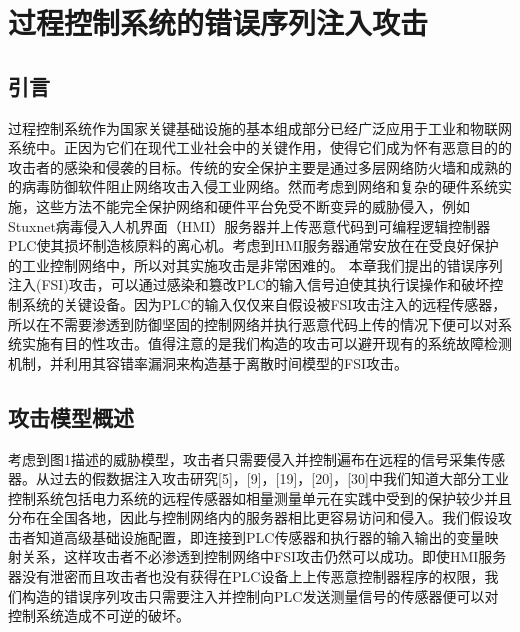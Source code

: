 
\chapter{过程控制系统的错误序列注入攻击}
\label{chap:FSIattack}

\section{引言}
\label{sec:intro}

过程控制系统作为国家关键基础设施的基本组成部分已经广泛应用于工业和物联网系统中。正因为它们在现代工业社会中的关键作用，使得它们成为怀有恶意目的的攻击者的感染和侵袭的目标。传统的安全保护主要是通过多层网络防火墙和成熟的的病毒防御软件阻止网络攻击入侵工业网络。然而考虑到网络和复杂的硬件系统实施，这些方法不能完全保护网络和硬件平台免受不断变异的威胁侵入，例如Stuxnet病毒侵入人机界面（HMI）服务器并上传恶意代码到可编程逻辑控制器PLC使其损坏制造核原料的离心机。考虑到HMI服务器通常安放在在受良好保护的工业控制网络中，所以对其实施攻击是非常困难的。
本章我们提出的错误序列注入(FSI)攻击，可以通过感染和篡改PLC的输入信号迫使其执行误操作和破坏控制系统的关键设备。因为PLC的输入仅仅来自假设被FSI攻击注入的远程传感器，所以在不需要渗透到防御坚固的控制网络并执行恶意代码上传的情况下便可以对系统实施有目的性攻击。值得注意的是我们构造的攻击可以避开现有的系统故障检测机制，并利用其容错率漏洞来构造基于离散时间模型的FSI攻击。

\section{攻击模型概述}
\label{sec:formulation}

考虑到图1描述的威胁模型，攻击者只需要侵入并控制遍布在远程的信号采集传感器。从过去的假数据注入攻击研究[5]，[9]，[19]，[20]，[30]中我们知道大部分工业控制系统包括电力系统的远程传感器如相量测量单元在实践中受到的保护较少并且分布在全国各地，因此与控制网络内的服务器相比更容易访问和侵入。我们假设攻击者知道高级基础设施配置，即连接到PLC传感器和执行器的输入输出的变量映射关系，这样攻击者不必渗透到控制网络中FSI攻击仍然可以成功。即使HMI服务器没有泄密而且攻击者也没有获得在PLC设备上上传恶意控制器程序的权限，我们构造的错误序列攻击只需要注入并控制向PLC发送测量信号的传感器便可以对控制系统造成不可逆的破坏。

